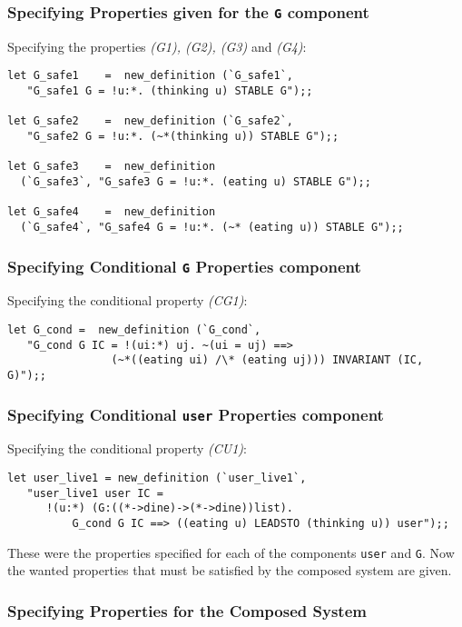 \subsubsection{Specifying Properties given for the {\tt G} component}

Specifying the properties {\it (G1), (G2), (G3)} and {\it (G4)}:
{\footnotesize 
\begin{verbatim}
let G_safe1    =  new_definition (`G_safe1`,
   "G_safe1 G = !u:*. (thinking u) STABLE G");;

let G_safe2    =  new_definition (`G_safe2`,
   "G_safe2 G = !u:*. (~*(thinking u)) STABLE G");;

let G_safe3    =  new_definition
  (`G_safe3`, "G_safe3 G = !u:*. (eating u) STABLE G");;

let G_safe4    =  new_definition
  (`G_safe4`, "G_safe4 G = !u:*. (~* (eating u)) STABLE G");;
\end{verbatim}
}

\subsubsection{Specifying Conditional {\tt G} Properties component}

Specifying the conditional property {\it (CG1)}:
{\footnotesize 
\begin{verbatim}
let G_cond =  new_definition (`G_cond`,
   "G_cond G IC = !(ui:*) uj. ~(ui = uj) ==>
                (~*((eating ui) /\* (eating uj))) INVARIANT (IC, G)");;
\end{verbatim}
}

\subsubsection{Specifying Conditional {\tt user} Properties component}

Specifying the conditional property {\it (CU1)}:
{\footnotesize 
\begin{verbatim}
let user_live1 = new_definition (`user_live1`,
   "user_live1 user IC =
      !(u:*) (G:((*->dine)->(*->dine))list).
          G_cond G IC ==> ((eating u) LEADSTO (thinking u)) user");;
\end{verbatim}
}

These were the properties specified for each of the components {\tt user}
and {\tt G}.  Now the wanted properties that must be satisfied by the
composed system are given.

\subsubsection{Specifying Properties for the Composed System}

